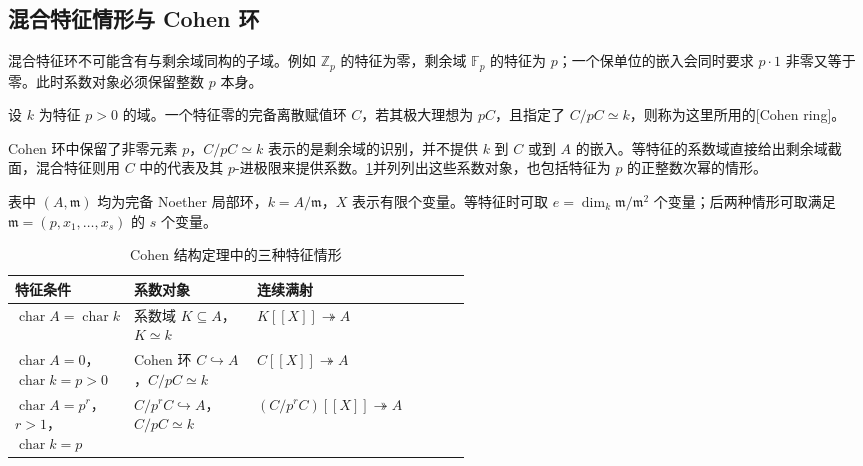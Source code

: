 \subsection{混合特征情形与 Cohen 环}
\label{b3:subsec:D02:03}

混合特征环不可能含有与剩余域同构的子域。例如 \(\mathbb Z_p\) 的特征为零，剩余域 \(\mathbb F_p\) 的特征为 \(p\)；一个保单位的嵌入会同时要求 \(p\cdot1\) 非零又等于零。此时系数对象必须保留整数 \(p\) 本身。

\begin{definition}\label{b3:def:cohen-ring}
	设 \(k\) 为特征 \(p>0\) 的域。一个特征零的完备离散赋值环 \(C\)，若其极大理想为 \(pC\)，且指定了 \(C/pC\simeq k\)，则称为这里所用的[Cohen ring]。
\end{definition}

Cohen 环中保留了非零元素 \(p\)，\(C/pC\simeq k\) 表示的是剩余域的识别，并不提供 \(k\) 到 \(C\) 或到 \(A\) 的嵌入。等特征的系数域直接给出剩余域截面，混合特征则用 \(C\) 中的代表及其 \(p\)-进极限来提供系数。\cref{b3:tab:D-cohen-characteristic-cases}并列列出这些系数对象，也包括特征为 \(p\) 的正整数次幂的情形。

\ProseParagraphBreak
表中 \((A,\mathfrak m)\) 均为完备 Noether 局部环，\(k=A/\mathfrak m\)，\(X\) 表示有限个变量。等特征时可取 \(e=\dim_k\mathfrak m/\mathfrak m^2\) 个变量；后两种情形可取满足 \(\mathfrak m=(p,x_1,\ldots,x_s)\) 的 \(s\) 个变量。

\begin{table}[htbp]
	\centering
	\caption{Cohen 结构定理中的三种特征情形}
	\label{b3:tab:D-cohen-characteristic-cases}
	\begin{tabularx}{\linewidth}{@{}>{\raggedright\arraybackslash}p{0.26\linewidth}>{\raggedright\arraybackslash}p{0.27\linewidth}>{\raggedright\arraybackslash}X@{}}
		\toprule
		特征条件 & 系数对象 & 连续满射 \\
		\midrule
		\(\operatorname{char}A=\operatorname{char}k\) & 系数域 \(K\subseteq A\)，\(K\simeq k\) & \(K[\![X]\!]\twoheadrightarrow A\) \\
		\(\operatorname{char}A=0\)，\(\operatorname{char}k=p>0\) & Cohen 环 \(C\hookrightarrow A\)，\(C/pC\simeq k\) & \(C[\![X]\!]\twoheadrightarrow A\) \\
		\(\operatorname{char}A=p^r\)，\(r>1\)，\(\operatorname{char}k=p\) & \(C/p^rC\hookrightarrow A\)，\(C/pC\simeq k\) & \((C/p^rC)[\![X]\!]\twoheadrightarrow A\) \\
		\bottomrule
	\end{tabularx}
\end{table}


